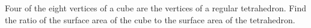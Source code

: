 Four of the eight vertices of a cube are the vertices of a regular tetrahedron. Find the ratio of the surface area of the cube to the surface area of the tetrahedron.
